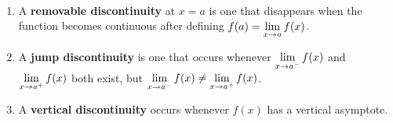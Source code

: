 \documentclass[../mathNotesPreamble]{subfiles}
\begin{document}
  \begin{defn*}\
    \begin{enumerate}[label=,itemsep=\stretch{1}]
      \item A \textbf{removable discontinuity} at $x=a$ is one that disappears when the function becomes continuous after defining $f(a)=\displaystyle\lim_{x \to a} f(x)$.
      \item A \textbf{jump discontinuity} is one that occurs whenever $\displaystyle\lim_{x \to a^-} f(x)$ and $\displaystyle\lim_{x \to a^+} f(x)$ both exist, but $\displaystyle\lim_{x \to a^-} f(x)\neq\lim_{x \to a^+} f(x)$.
      \item A \textbf{vertical discontinuity} occurs whenever $f(x)$ has a vertical asymptote.
    \end{enumerate}
  \end{defn*}
\end{document}
